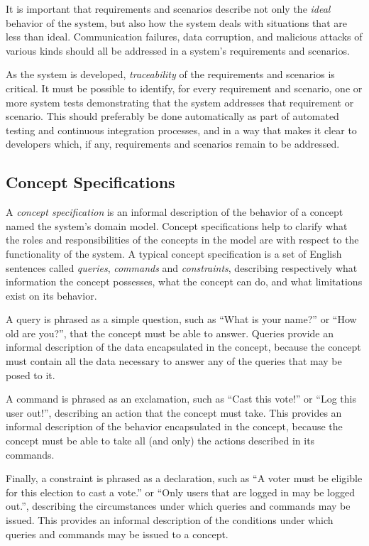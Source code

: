 It is important that requirements and scenarios describe not only the
\emph{ideal} behavior of the system, but also how the system deals
with situations that are less than ideal. Communication failures, data
corruption, and malicious attacks of various kinds should all be
addressed in a system's requirements and scenarios.

As the system is developed, \emph{traceability} of the requirements
and scenarios is critical. It must be possible to identify, for every
requirement and scenario, one or more system tests demonstrating that
the system addresses that requirement or scenario. This should
preferably be done automatically as part of automated testing and
continuous integration processes, and in a way that makes it clear to
developers which, if any, requirements and scenarios remain to be
addressed.

\subsection{Concept Specifications}

A \emph{concept specification} is an informal description of the
behavior of a concept named the system's domain model. Concept
specifications help to clarify what the roles and responsibilities of
the concepts in the model are with respect to the functionality of the
system. A typical concept specification is a set of English sentences
called \emph{queries}, \emph{commands} and \emph{constraints},
describing respectively what information the concept possesses, what
the concept can do, and what limitations exist on its
behavior.

A query is phrased as a simple question, such as ``What is your
name?'' or ``How old are you?'', that the concept must be able to
answer. Queries provide an informal description of the data
encapsulated in the concept, because the concept must contain all the
data necessary to answer any of the queries that may be posed to it. 

A command is phrased as an exclamation, such as ``Cast this vote!'' or
``Log this user out!'', describing an action that the concept must
take. This provides an informal description of the behavior
encapsulated in the concept, because the concept must be able to take
all (and only) the actions described in its commands.

Finally, a constraint is phrased as a declaration, such as ``A voter
must be eligible for this election to cast a vote.'' or ``Only users
that are logged in may be logged out.'', describing the circumstances
under which queries and commands may be issued. This provides an
informal description of the conditions under which queries and
commands may be issued to a concept. 

